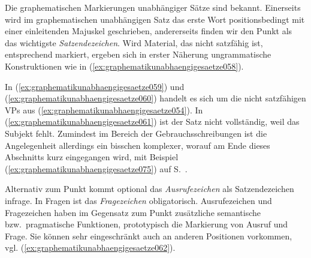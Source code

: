 Die graphematischen Markierungen unabhängiger Sätze sind bekannt.
Einerseits wird im graphematischen unabhängigen Satz das erste Wort positionsbedingt mit einer einleitenden Majuskel geschrieben, andererseits finden wir den Punkt als das wichtigste \textit{Satzendezeichen}.
Wird Material, das nicht satzfähig ist, entsprechend markiert, ergeben sich in erster Näherung ungrammatische Konstruktionen wie in (\ref{ex:graphematikunabhaengigesaetze058}).

\begin{exe}
  \ex\label{ex:graphematikunabhaengigesaetze058}
  \begin{xlist}
  \end{xlist}
\end{exe}

In (\ref{ex:graphematikunabhaengigesaetze059}) und (\ref{ex:graphematikunabhaengigesaetze060}) handelt es sich um die nicht satzfähigen VPs aus (\ref{ex:graphematikunabhaengigesaetze054}).
In (\ref{ex:graphematikunabhaengigesaetze061}) ist der Satz nicht vollständig, weil das Subjekt fehlt.
Zumindest im Bereich der Gebrauchsschreibungen ist die Angelegenheit allerdings ein bisschen komplexer, worauf am Ende dieses Abschnitts kurz eingegangen wird, \zB mit Beispiel (\ref{ex:graphematikunabhaengigesaetze075}) auf S.~\pageref{ex:graphematikunabhaengigesaetze075}.

Alternativ zum Punkt kommt optional das \textit{Ausrufezeichen} als Satzendezeichen infrage.
In Fragen ist das \textit{Fragezeichen} obligatorisch.
Ausrufezeichen und Fragezeichen haben im Gegensatz zum Punkt zusätzliche semantische bzw.\ pragmatische Funktionen, prototypisch die Markierung von Ausruf und Frage.
Sie können sehr eingeschränkt auch an anderen Positionen vorkommen, vgl. (\ref{ex:graphematikunabhaengigesaetze062}).

\begin{exe}
  \ex\label{ex:graphematikunabhaengigesaetze062}
  \begin{xlist}
  \end{xlist}
\end{exe}

